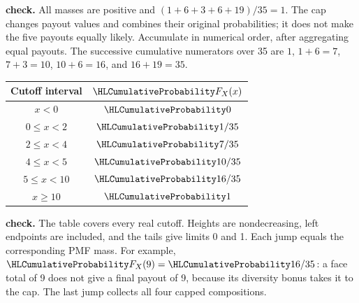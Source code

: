 \textbf{ check.} All masses are positive and $(1+6+3+6+19)/35=1$. The cap changes payout values and combines their original probabilities; it does not make the five payouts equally likely.
Accumulate in numerical order, after aggregating equal payouts. The successive cumulative numerators over 35 are $1$, $1+6=7$, $7+3=10$, $10+6=16$, and $16+19=35$.
\par\noindent\begin{minipage}[t]{.38\linewidth}\vspace{0pt}\centering
\begin{tabular}{cc}\toprule Cutoff interval & $\cTwoCDFHL{F_X(x)}$ \\\midrule
$x<0$ & $\cTwoCDFHL{0}$ \\
$0\leq x<2$ & $\cTwoCDFHL{1/35}$ \\
$2\leq x<4$ & $\cTwoCDFHL{7/35}$ \\
$4\leq x<5$ & $\cTwoCDFHL{10/35}$ \\
$5\leq x<10$ & $\cTwoCDFHL{16/35}$ \\
$x\geq10$ & $\cTwoCDFHL{1}$ \\\bottomrule\end{tabular}
\end{minipage}\hfill\begin{minipage}[t]{.59\linewidth}\vspace{0pt}\centering
{}\end{minipage}\par
\textbf{ check.} The table covers every real cutoff. Heights are nondecreasing, left endpoints are included, and the tails give limits 0 and 1. Each jump equals the corresponding PMF mass. For example, $\cTwoCDFHL{F_X(9)}=\cTwoCDFHL{16/35}$: a face total of 9 does not give a final payout of 9, because its diversity bonus takes it to the cap. The last jump collects all four capped compositions.
\clearpage
